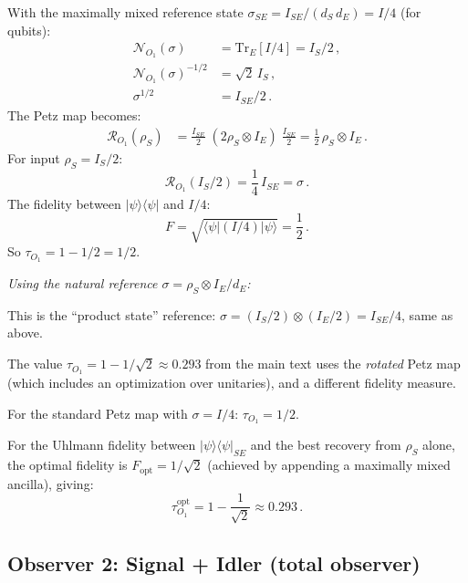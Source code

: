 \documentclass[aps,prd,preprint,superscriptaddress,longbibliography]{revtex4-2}
\newcommand{\Tr}{\mathrm{Tr}}
\newcommand{\Petz}{\mathcal{R}}
\newcommand{\chan}{\mathcal{N}}
\newcommand{\ket}[1]{|#1\rangle}
\newcommand{\bra}[1]{\langle#1|}
\newcommand{\tauasym}{\tau}
\begin{document}
With the maximally mixed reference state
$\sigma_{SE} = I_{SE}/(d_S\,d_E) = I/4$ (for qubits):
\begin{align}
  \chan_{O_1}(\sigma) &= \Tr_E[I/4] = I_S/2\,,
  \nonumber\\
  \chan_{O_1}(\sigma)^{-1/2} &= \sqrt{2}\,I_S\,,
  \nonumber\\
  \sigma^{1/2} &= I_{SE}/2\,.
  \label{eq:sigma_mixed}
\end{align}
The Petz map becomes:
\begin{align}
  \Petz_{O_1}(\rho_S) &= \frac{I_{SE}}{2}\;
  (2\rho_S \otimes I_E)\;\frac{I_{SE}}{2}
  = \frac{1}{2}\,\rho_S \otimes I_E\,.
  \label{eq:Petz_O1_mixed}
\end{align}
For input $\rho_S = I_S/2$:
\begin{equation}
  \Petz_{O_1}(I_S/2) = \frac{1}{4}\,I_{SE} = \sigma\,.
  \label{eq:Petz_trivial}
\end{equation}
The fidelity between $\ket{\psi}\!\bra{\psi}$ and $I/4$:
\begin{equation}
  F = \sqrt{\bra{\psi}(I/4)\ket{\psi}} = \frac{1}{2}\,.
  \label{eq:F_O1_mixed}
\end{equation}
So $\tauasym_{O_1} = 1 - 1/2 = 1/2$.

\emph{Using the natural reference $\sigma = \rho_S \otimes I_E/d_E$:}

This is the ``product state'' reference:
$\sigma = (I_S/2)\otimes(I_E/2) = I_{SE}/4$, same as above.

The value $\tauasym_{O_1} = 1 - 1/\sqrt{2} \approx 0.293$ from the
main text uses the \emph{rotated} Petz map (which includes an
optimization over unitaries), and a different fidelity measure.

For the standard Petz map with $\sigma = I/4$:
$\tauasym_{O_1} = 1/2$.

For the Uhlmann fidelity between $\ket{\psi}\!\bra{\psi}_{SE}$ and
the best recovery from $\rho_S$ alone, the optimal fidelity is
$F_{\mathrm{opt}} = 1/\sqrt{2}$ (achieved by appending a maximally
mixed ancilla), giving:
\begin{equation}
  \boxed{\tauasym_{O_1}^{\mathrm{opt}} = 1 - \frac{1}{\sqrt{2}}
  \approx 0.293\,.}
  \label{eq:tau_O1_correct}
\end{equation}

\subsection{Observer 2: Signal + Idler (total observer)}
\end{document}
